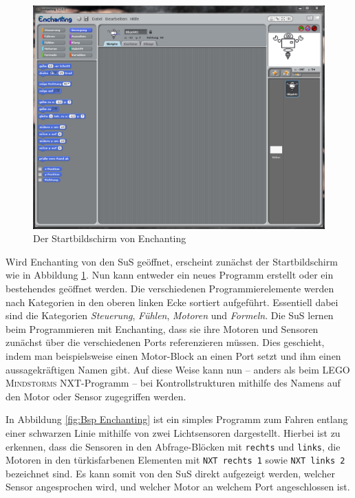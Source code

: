 \documentclass[paper=a4, DIV=calc, BCOR=12mm, twoside=on, onecolumn=on, open = right, titlepage =on, parskip =half-, headsepline = on, footsepline = off, chapterprefix = off, appendixprefix = on, fontsize = 12pt, numbers = noenddot, abstract = on]{scrbook}
\begin{document}
\begin{figure}[htb]
\centering
\includegraphics[width=\textwidth]{images/Enchanting_Start.png} 
\caption{Der Startbildschirm von Enchanting}
\label{fig:Enchanting Start}
\end{figure}


Wird Enchanting von den SuS geöffnet, erscheint zunächst der Startbildschirm wie in Abbildung \ref{fig:Enchanting Start}. Nun kann entweder ein neues Programm erstellt oder ein bestehendes geöffnet werden. Die verschiedenen Programmierelemente werden nach Kategorien in den oberen linken Ecke sortiert aufgeführt. Essentiell dabei sind die Kategorien \emph{Steuerung}, \emph{Fühlen}, \emph{Motoren} und \emph{Formeln}. Die SuS lernen beim Programmieren mit Enchanting, dass sie ihre Motoren und Sensoren zunächst über die verschiedenen Ports referenzieren müssen. Dies geschieht, indem man beispielsweise einen Motor-Block an einen Port setzt und ihm einen aussagekräftigen Namen gibt. Auf diese Weise kann nun -- anders als beim \textsc{LEGO Mindstorms} NXT-Programm -- bei Kontrollstrukturen mithilfe des Namens auf den Motor oder Sensor zugegriffen werden.

In Abbildung \ref{fig:Bsp Enchanting} ist ein simples Programm zum Fahren entlang einer schwarzen Linie mithilfe von zwei Lichtsensoren dargestellt. Hierbei ist zu erkennen, dass die Sensoren in den Abfrage-Blöcken mit \texttt{rechts} und \texttt{links}, die Motoren in den türkisfarbenen Elementen mit \texttt{NXT rechts 1} sowie \texttt{NXT links 2} bezeichnet sind. Es kann somit von den SuS direkt aufgezeigt werden, welcher Sensor angesprochen wird, und welcher Motor an welchem Port angeschlossen ist.
\end{document}
